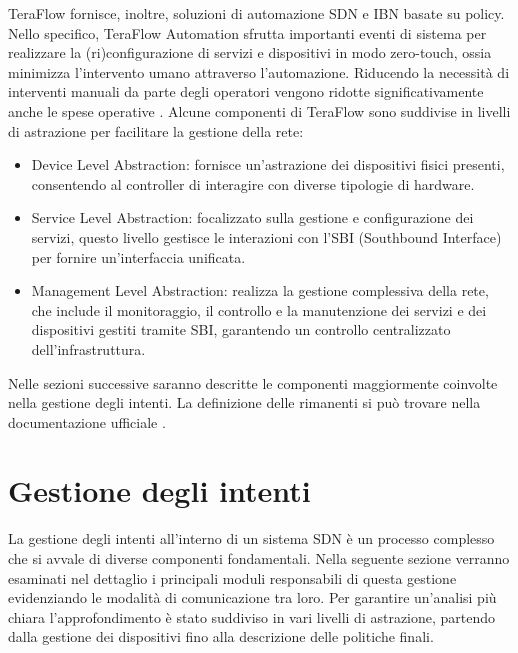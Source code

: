 \newline TeraFlow fornisce, inoltre, soluzioni di automazione SDN e IBN basate su policy. Nello specifico, TeraFlow Automation sfrutta 
importanti eventi di sistema per realizzare la (ri)configurazione di servizi e dispositivi in modo zero-touch, ossia minimizza l'intervento umano attraverso l'automazione.
Riducendo la necessità di interventi manuali da parte degli operatori vengono ridotte significativamente anche le spese operative \cite{Component}.
\newline Alcune componenti di TeraFlow sono suddivise in livelli di astrazione per facilitare la gestione della rete:
\begin{itemize}
\item Device Level Abstraction: fornisce un'astrazione dei dispositivi fisici presenti, consentendo al controller di interagire con diverse tipologie di hardware.
\item Service Level Abstraction: focalizzato sulla gestione e configurazione dei servizi, questo livello gestisce le interazioni con l'SBI (Southbound Interface) per fornire un'interfaccia unificata.
\item Management Level Abstraction: realizza la gestione complessiva della rete, che include il monitoraggio, il controllo e la manutenzione dei servizi e dei dispositivi gestiti tramite SBI, garantendo un controllo centralizzato dell'infrastruttura.
\end{itemize}
Nelle sezioni successive saranno descritte le componenti maggiormente coinvolte nella gestione degli intenti.
La definizione delle rimanenti si può trovare nella documentazione ufficiale \cite{D32}. 

\section{Gestione degli intenti}
La gestione degli intenti all'interno di un sistema SDN è un processo complesso che si avvale di diverse componenti fondamentali. 
Nella seguente sezione verranno esaminati nel dettaglio i principali moduli responsabili di questa gestione 
evidenziando le modalità di comunicazione tra loro.
Per garantire un'analisi più chiara l'approfondimento è stato suddiviso in vari livelli di astrazione, 
partendo dalla gestione dei dispositivi fino alla descrizione delle politiche finali.
